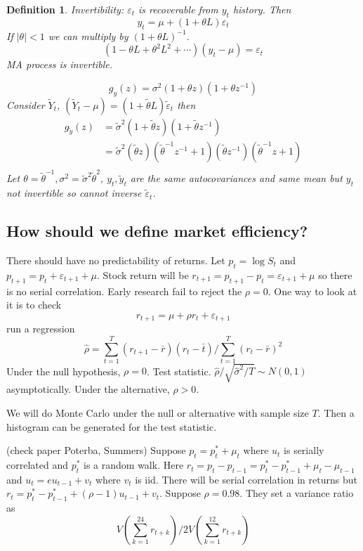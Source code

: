 \documentclass[11pt, a4paper, oneside]{article}
\newtheorem{mydef}{Definition}
\theoremstyle{definition}
\theoremstyle{proposition}
\theoremstyle{corollary}
\theoremstyle{lemma}
\theoremstyle{theorem}
\begin{document}
\begin{mydef}
Invertibility: $\varepsilon_t$ is recoverable from $y_t$ history. Then
$$y_t = \mu + (1 + \theta L)\varepsilon_t$$ If $|\theta| < 1$ we can multiply by $(1+\theta L)^{-1}$. 
$$(1 - \theta L + \theta^2 L^2 + \cdots)(y_t - \mu) = \varepsilon_t$$ MA process is invertible. 

$$g_y(z) = \sigma^2(1 + \theta z)(1 + \theta z^{-1})$$ Consider $\tilde{Y}_t$, $(\tilde{Y}_t - \mu) = (1 + \tilde{\theta} L)\tilde{\varepsilon}_t$ then
\begin{align*}
g_{\tilde{y}}(z) &= \tilde{\sigma}^2(1 + \tilde{\theta} z)(1 + \tilde{\theta} z^{-1}) \\
&=\tilde{\sigma}^2(\tilde{\theta} z)(\tilde{\theta}^{-1}z^{-1} + 1)(\tilde{\theta} z^{-1})(\tilde{\theta}^{-1}z +1)\\
\end{align*} 
Let $\theta = \tilde{\theta}^{-1}, \sigma^2 = \tilde{\sigma}^2\tilde{\theta}^2$, $y_t, \tilde{y}_t$ are the same autocovariances and same mean but $y_t$ not invertible so cannot inverse $\tilde{\varepsilon}_t$.
\end{mydef}

\subsection{How should we define market efficiency?}
There should have no predictability of returns. Let $p_t = \log{S_t}$ and $p_{t+1} = p_{t} + \varepsilon_{t+1} + \mu$. Stock return will be $r_{t+1} = p_{t+1} - p_t = \varepsilon_{t+1} + \mu$ so there is no serial correlation. Early research fail to reject the $\rho = 0$. One way to look at it is to check 
$$r_{t+1} = \mu + \rho r_t + \varepsilon_{t+1}$$ run a regression
$$\hat{\rho} =\sum_{t=1}^T(r_{t+1} - \bar{r})(r_{t} - \bar{t})/\sum_{t=1}^T (r_t - \bar{r})^2$$
Under the null hypothesis, $\rho = 0$. Test statistic. $\hat{\rho}/\sqrt{\hat{\sigma}^2/ T} \sim N(0, 1)$ asymptotically. Under the alternative, $\rho > 0$. 

We will do Monte Carlo under the null or alternative with sample size $T$. Then a histogram can be generated for the test statistic. 

(check paper Poterba, Summers)
Suppose $p_t = p_t^* + \mu_t$ where $u_t$ is serially correlated and $p^*_t$ is a random walk. Here $r_t = p_t - p_{t-1} =p^*_t - p_{t-1}^* + \mu_t - \mu_{t-1}$ and $u_t = eu_{t-1} + v_t$ where $v_t$ is iid. There will be serial correlation in returns but $r_t = p_t^* - p_{t-1}^* +(\rho -1)u_{t-1} + v_t$. Suppose $\rho = 0.98$. They set a variance ratio as $$V(\sum_{k=1}^{24}r_{t+k}) /2V(\sum_{k=1}^{12} r_{t+k})$$
\end{document}
